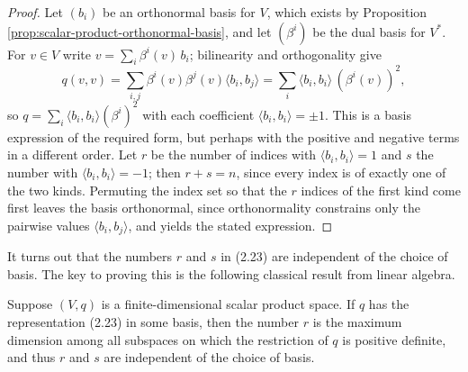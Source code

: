 \begin{proof}
\leanok
{}
Let $(b_i)$ be an orthonormal basis for $V$, which exists by Proposition \ref{prop:scalar-product-orthonormal-basis}, and let $(\beta^i)$ be the dual basis for $V^*$. For $v \in V$ write $v = \sum_i \beta^i(v) \, b_i$; bilinearity and orthogonality give
\[
q(v,v) = \sum_{i,j} \beta^i(v)\beta^j(v) \langle b_i, b_j\rangle = \sum_i \langle b_i, b_i \rangle \, (\beta^i(v))^2 ,
\]
so $q = \sum_i \langle b_i, b_i\rangle (\beta^i)^2$ with each coefficient $\langle b_i, b_i \rangle = \pm 1$. This is a basis expression of the required form, but perhaps with the positive and negative terms in a different order. Let $r$ be the number of indices with $\langle b_i, b_i \rangle = 1$ and $s$ the number with $\langle b_i, b_i \rangle = -1$; then $r + s = n$, since every index is of exactly one of the two kinds. Permuting the index set so that the $r$ indices of the first kind come first leaves the basis orthonormal, since orthonormality constrains only the pairwise values $\langle b_i, b_j \rangle$, and yields the stated expression.
\end{proof}

It turns out that the numbers $r$ and $s$ in (2.23) are independent of the choice of basis. The key to proving this is the following classical result from linear algebra.

\begin{proposition}
\label{prop:sylvesters-law-inertia}
\leanok
{}
Suppose $(V, q)$ is a finite-dimensional scalar product space. If $q$ has the representation (2.23) in some basis, then the number $r$ is the maximum dimension among all subspaces on which the restriction of $q$ is positive definite, and thus $r$ and $s$ are independent of the choice of basis.
\end{proposition}

